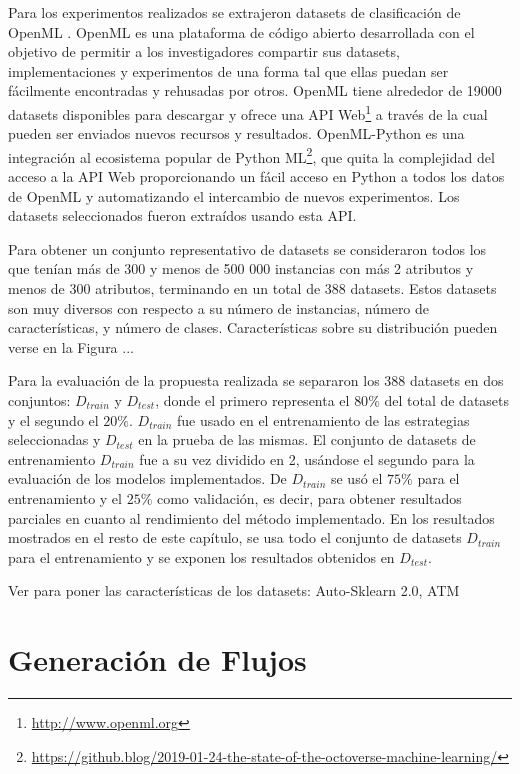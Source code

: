 Para los experimentos realizados se extrajeron datasets de clasificación de OpenML \cite{vanschoren2014openml}. OpenML es una plataforma de código abierto desarrollada con el objetivo de permitir a los investigadores compartir sus datasets, implementaciones y experimentos de una forma tal que ellas puedan ser fácilmente encontradas y rehusadas por otros. OpenML tiene alrededor de 19000 datasets disponibles para descargar y ofrece una API Web\footnote{\url{http://www.openml.org}} a través de la cual pueden ser enviados nuevos recursos y resultados. OpenML-Python \cite{feurer2019openmlpy} es una integración al ecosistema popular de Python ML\footnote{\url{https://github.blog/2019-01-24-the-state-of-the-octoverse-machine-learning/}}, que quita la complejidad del acceso a la API Web proporcionando un fácil acceso en Python a todos los datos de OpenML y automatizando el intercambio de nuevos experimentos. Los datasets seleccionados fueron extraídos usando esta API.
 
 Para obtener un conjunto representativo de datasets se consideraron todos los que tenían más de 300  y menos de 500 000 instancias con más 2 atributos y menos de 300 atributos, terminando en un total de 388 datasets. Estos datasets son muy diversos con respecto a su número de instancias, número de características, y número de clases. Características sobre su distribución pueden verse en la Figura ...
 
 Para la evaluación de la propuesta realizada se separaron los 388 datasets en dos conjuntos: $D_{train}$ y $D_{test}$, donde el primero representa el $80\%$ del total de datasets y el segundo el $20\%$. $D_{train}$ fue usado en el entrenamiento de las estrategias seleccionadas y $D_{test}$ en la prueba de las mismas. El conjunto de datasets de entrenamiento $D_{train}$ fue a su vez dividido en 2, usándose el segundo para la evaluación de los modelos implementados. De $D_{train}$ se usó el $75\%$ para el entrenamiento y el $25\%$ como validación, es decir, para obtener resultados parciales en cuanto al rendimiento del método implementado. En los resultados mostrados en el resto de este capítulo, se usa todo el conjunto de datasets $D_{train}$ para el entrenamiento y se exponen los resultados obtenidos en $D_{test}$.
 
 Ver para poner las características de los datasets: Auto-Sklearn 2.0, ATM
 
 \section{Generación de Flujos}\label{sec:flujos}
 
